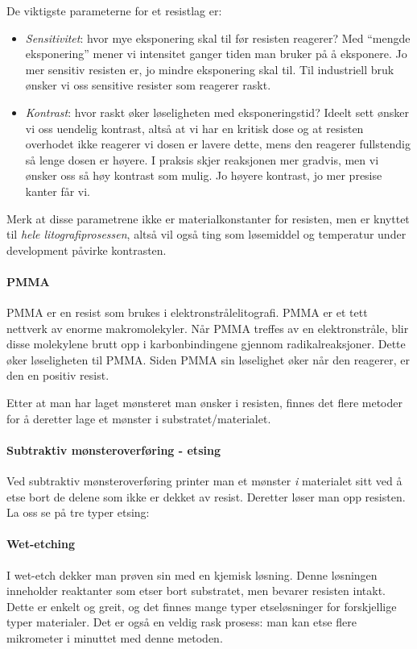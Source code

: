 De viktigste parameterne for et resistlag er:
\begin{itemize}
	\item \emph{Sensitivitet}: hvor mye eksponering skal til før resisten reagerer? Med ``mengde eksponering'' mener vi intensitet ganger tiden man bruker på å eksponere. Jo mer sensitiv resisten er, jo mindre eksponering skal til. Til industriell bruk ønsker vi oss sensitive resister som reagerer raskt.
	\item \emph{Kontrast}: hvor raskt øker løseligheten med eksponeringstid? Ideelt sett ønsker vi oss uendelig kontrast, altså at vi har en kritisk dose og at resisten overhodet ikke reagerer vi dosen er lavere dette, mens den reagerer fullstendig så lenge dosen er høyere. I praksis skjer reaksjonen mer gradvis, men vi ønsker oss så høy kontrast som mulig. Jo høyere kontrast, jo mer presise kanter får vi.
\end{itemize}
Merk at disse parametrene ikke er materialkonstanter for resisten, men er knyttet til \emph{hele litografiprosessen}, altså vil også ting som løsemiddel og temperatur under development påvirke kontrasten.

\paragraph{PMMA} PMMA er en resist som brukes i elektronstrålelitografi. PMMA er et tett nettverk av enorme makromolekyler. Når PMMA treffes av en elektronstråle, blir disse molekylene brutt opp i karbonbindingene gjennom radikalreaksjoner. Dette øker løseligheten til PMMA. Siden PMMA sin løselighet øker når den reagerer, er den en positiv resist.

Etter at man har laget mønsteret man ønsker i resisten, finnes det flere metoder for å deretter lage et mønster i substratet/materialet.

\paragraph{Subtraktiv mønsteroverføring - etsing} Ved subtraktiv mønsteroverføring printer man et mønster \emph{i} materialet sitt ved å etse bort de delene som ikke er dekket av resist. Deretter løser man opp resisten. La oss se på tre typer etsing:

\paragraph{Wet-etching} I wet-etch dekker man prøven sin med en kjemisk løsning. Denne løsningen inneholder reaktanter som etser bort substratet, men bevarer resisten intakt. Dette er enkelt og greit, og det finnes mange typer etseløsninger for forskjellige typer materialer. Det er også en veldig rask prosess: man kan etse flere mikrometer i minuttet med denne metoden.

